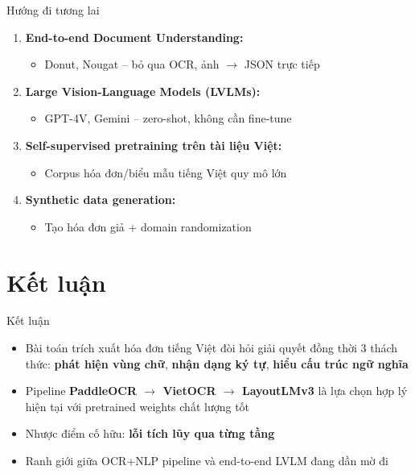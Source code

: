 \documentclass[aspectratio=169]{beamer}
\begin{document}
\begin{frame}{Hướng đi tương lai}
    \begin{enumerate}
        \item \textbf{End-to-end Document Understanding:}
        \begin{itemize}
            \item Donut, Nougat -- bỏ qua OCR, ảnh $\rightarrow$ JSON trực tiếp
        \end{itemize}
        \item \textbf{Large Vision-Language Models (LVLMs):}
        \begin{itemize}
            \item GPT-4V, Gemini -- zero-shot, không cần fine-tune
        \end{itemize}
        \item \textbf{Self-supervised pretraining trên tài liệu Việt:}
        \begin{itemize}
            \item Corpus hóa đơn/biểu mẫu tiếng Việt quy mô lớn
        \end{itemize}
        \item \textbf{Synthetic data generation:}
        \begin{itemize}
            \item Tạo hóa đơn giả + domain randomization
        \end{itemize}
    \end{enumerate}
\end{frame}

\section{Kết luận}

\begin{frame}{Kết luận}
    \begin{itemize}
        \item Bài toán trích xuất hóa đơn tiếng Việt đòi hỏi giải quyết đồng thời 3 thách thức: \textbf{phát hiện vùng chữ}, \textbf{nhận dạng ký tự}, \textbf{hiểu cấu trúc ngữ nghĩa}
        \vspace{0.2cm}
        \item Pipeline \textbf{PaddleOCR $\rightarrow$ VietOCR $\rightarrow$ LayoutLMv3} là lựa chọn hợp lý hiện tại với pretrained weights chất lượng tốt
        \vspace{0.2cm}
        \item Nhược điểm cố hữu: \textbf{lỗi tích lũy qua từng tầng}
        \vspace{0.2cm}
        \item Ranh giới giữa OCR+NLP pipeline và end-to-end LVLM đang dần mờ đi
    \end{itemize}
\end{frame}
\end{document}
